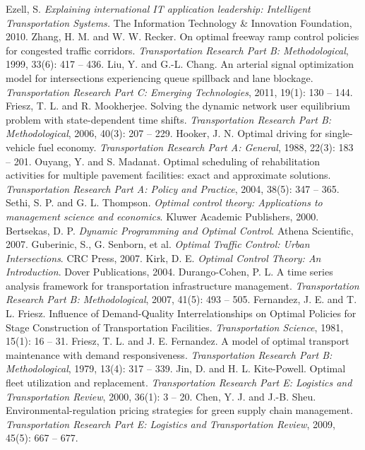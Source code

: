 \documentclass[12pt,onecolumn,twoside]{JCTA}
\theoremstyle{mystyle}
\begin{document}
\begin{thebibliography}{99}
Ezell, S. \textit{Explaining international IT application leadership: Intelligent Transportation Systems.} The Information Technology \& Innovation Foundation, 2010.
Zhang, H. M. and W. W. Recker. On optimal freeway ramp control policies for congested traffic corridors. \textit{Transportation Research Part B: Methodological}, 1999, 33(6): 417 -- 436.
Liu, Y. and G.-L. Chang. An arterial signal optimization model for intersections experiencing queue spillback and lane blockage. \textit{Transportation Research Part C: Emerging Technologies}, 2011, 19(1): 130 -- 144.
Friesz, T. L. and R. Mookherjee. Solving the dynamic network user equilibrium problem with state-dependent time shifts. \textit{Transportation Research Part B: Methodological}, 2006, 40(3): 207 -- 229.
Hooker, J. N. Optimal driving for single-vehicle fuel economy. \textit{Transportation Research Part A: General}, 1988, 22(3): 183 -- 201.
Ouyang, Y. and S. Madanat. Optimal scheduling of rehabilitation activities for multiple pavement facilities: exact and approximate solutions. \textit{Transportation Research Part A: Policy and Practice}, 2004, 38(5): 347 -- 365.
Sethi, S. P. and G. L. Thompson. \textit{Optimal control theory: Applications to management science and economics}.
Kluwer Academic Publishers, 2000.
Bertsekas, D. P. \textit{Dynamic Programming and Optimal Control}.
Athena Scientific, 2007.
Guberinic, S., G. Senborn, et al. \textit{Optimal Traffic Control: Urban Intersections}.
CRC Press, 2007.
Kirk, D. E. \textit{Optimal Control Theory: An Introduction}.
Dover Publications, 2004.
Durango-Cohen, P. L. A time series analysis framework for transportation infrastructure management. \textit{Transportation Research Part B: Methodological}, 2007, 41(5): 493 -- 505.
Fernandez, J. E. and T. L. Friesz. Influence of Demand-Quality Interrelationships on Optimal Policies for Stage Construction of Transportation Facilities. \textit{Transportation Science}, 1981, 15(1): 16 -- 31.
Friesz, T. L. and J. E. Fernandez. A model of optimal transport maintenance with demand responsiveness. \textit{Transportation Research Part B: Methodological}, 1979, 13(4): 317 -- 339.
Jin, D. and H. L. Kite-Powell. Optimal fleet utilization and replacement. \textit{Transportation Research Part E: Logistics and Transportation Review}, 2000, 36(1): 3 -- 20.
Chen, Y. J. and J.-B. Sheu. Environmental-regulation pricing strategies for green supply chain management. \textit{Transportation Research Part E: Logistics and Transportation Review}, 2009, 45(5): 667 -- 677.

\end{thebibliography}
\end{document}
